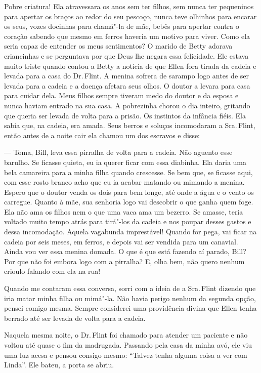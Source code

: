Pobre criatura! Ela atravessara os anos
sem ter filhos, sem nunca ter pequeninos para apertar os braços ao redor
do seu pescoço, nunca teve olhinhos para encarar os seus, vozes docinhas
para chamá"-la de mãe, bebês para apertar contra o coração sabendo que
mesmo em ferros haveria um motivo para viver. Como ela seria capaz de
entender os meus sentimentos? O marido de Betty adorava criancinhas e se
perguntava por que Deus lhe negara essa felicidade. Ele estava muito
triste quando contou a Betty a notícia de que Ellen fora tirada da
cadeia e levada para a casa do Dr.\,Flint. A menina sofrera de sarampo
logo antes de ser levada para a cadeia e a doença afetara seus olhos. O
doutor a levara para casa para cuidar dela. Meus filhos sempre tiveram
medo do doutor e da esposa e nunca haviam entrado na sua casa. A
pobrezinha chorou o dia inteiro, gritando que queria ser levada de volta
para a prisão. Os instintos da infância fiéis. Ela sabia que, na cadeia,
era amada. Seus berros e soluços incomodaram a Sra.\,Flint, então antes
de a noite cair ela chamou um dos escravos e disse:

--- Toma, Bill, leva essa pirralha de volta para a cadeia. Não aguento
esse barulho. Se ficasse quieta, eu ia querer ficar com essa diabinha.
Ela daria uma bela camareira para a minha filha quando crescesse. Se bem
que, se ficasse aqui, com esse rosto branco acho que eu ia acabar
matando ou mimando a menina. Espero que o doutor venda os dois para bem
longe, até onde a água e o vento os carregue. Quanto à mãe, sua senhoria
logo vai descobrir o que ganha quem foge. Ela não ama os filhos nem o
que uma vaca ama um bezerro. Se amasse, teria voltado muito tempo atrás
para tirá"-los da cadeia e nos poupar desses gastos e dessa incomodação.
Aquela vagabunda imprestável! Quando for pega, vai ficar na cadeia por
seis meses, em ferros, e depois vai ser vendida para um canavial. Ainda
vou ver essa menina domada. O que é que está fazendo aí parado, Bill?
Por que não foi embora logo com a pirralha? E, olha bem, não quero
nenhum crioulo falando com ela na rua!

Quando me contaram essa conversa, sorri
com a ideia de a Sra.\,Flint dizendo que iria matar minha filha ou
mimá"-la. Não havia perigo nenhum da segunda opção, pensei comigo mesma.
Sempre considerei uma providência divina que Ellen tenha berrado até ser
levada de volta para a cadeia.

Naquela mesma noite, o Dr.\,Flint foi
chamado para atender um paciente e não voltou até quase o fim da
madrugada. Passando pela casa da minha avó, ele viu uma luz acesa e
pensou consigo mesmo: ``Talvez tenha alguma coisa a ver com Linda''. Ele
bateu, a porta se abriu.

